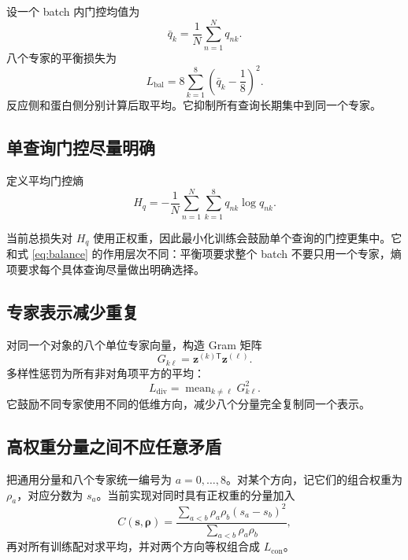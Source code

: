 \documentclass[UTF8,11pt,a4paper]{ctexart}
\begin{document}
设一个 batch 内门控均值为
\begin{equation}
\bar q_k=\frac1N\sum_{n=1}^{N}q_{nk}.
\end{equation}
八个专家的平衡损失为
\begin{equation}
L_{\mathrm{bal}}
=
8\sum_{k=1}^{8}\left(\bar q_k-\frac18\right)^2.
\label{eq:balance}
\end{equation}
反应侧和蛋白侧分别计算后取平均。它抑制所有查询长期集中到同一个专家。

\subsection{单查询门控尽量明确}

定义平均门控熵
\begin{equation}
H_q
=
-\frac1N\sum_{n=1}^{N}
\sum_{k=1}^{8}q_{nk}\log q_{nk}.
\label{eq:entropy}
\end{equation}

当前总损失对 $H_q$ 使用正权重，因此最小化训练会鼓励单个查询的门控更集中。它和式 \eqref{eq:balance} 的作用层次不同：平衡项要求整个 batch 不要只用一个专家，熵项要求每个具体查询尽量做出明确选择。

\subsection{专家表示减少重复}

对同一个对象的八个单位专家向量，构造 Gram 矩阵
\begin{equation}
G_{k\ell}
=
\bm z^{(k)\mathsf T}\bm z^{(\ell)}.
\end{equation}
多样性惩罚为所有非对角项平方的平均：
\begin{equation}
L_{\mathrm{div}}
=
\operatorname{mean}_{k\ne\ell}G_{k\ell}^2.
\label{eq:diversity}
\end{equation}
它鼓励不同专家使用不同的低维方向，减少八个分量完全复制同一个表示。

\subsection{高权重分量之间不应任意矛盾}

把通用分量和八个专家统一编号为 $a=0,\ldots,8$。对某个方向，记它们的组合权重为 $\rho_a$，对应分数为 $s_a$。当前实现对同时具有正权重的分量加入
\begin{equation}
C(\bm s,\bm\rho)
=
\frac{
\sum_{a<b}\rho_a\rho_b(s_a-s_b)^2
}{
\sum_{a<b}\rho_a\rho_b
},
\label{eq:consistency}
\end{equation}
再对所有训练配对求平均，并对两个方向等权组合成 $L_{\mathrm{con}}$。
\end{document}
